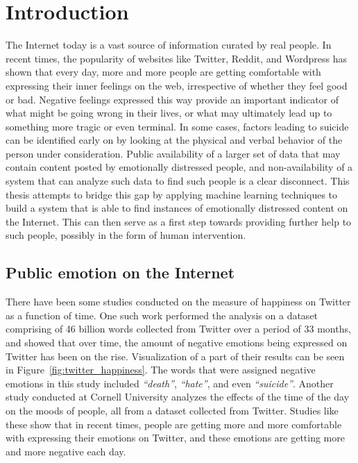 \chapter{Introduction}
\label{chapter:Introduction}

The Internet today is a vast source of information curated by real people. In recent times, the popularity of websites like Twitter, Reddit, and Wordpress has shown that every day, more and more people are getting comfortable with expressing their inner feelings on the web, irrespective of whether they feel good or bad. Negative feelings expressed this way provide an important indicator of what might be going wrong in their lives, or what may ultimately lead up to something more tragic or even terminal. In some cases, factors leading to suicide can be identified early on by looking at the physical and verbal behavior of the person under consideration. Public availability of a larger set of data that may contain content posted by emotionally distressed people, and non-availability of a system that can analyze such data to find such people is a clear disconnect. This thesis attempts to bridge this gap by applying machine learning techniques to build a system that is able to find instances of emotionally distressed content on the Internet. This can then serve as a first step towards providing further help to such people, possibly in the form of human intervention.

\section{Public emotion on the Internet}
There have been some studies conducted on the measure of happiness on Twitter as a function of time. One such work \cite{dodds2011temporal} performed the analysis on a dataset comprising of 46 billion words collected from Twitter over a period of 33 months, and showed that over time, the amount of negative emotions being expressed on Twitter has been on the rise. Visualization of a part of their results can be seen in Figure~\ref{fig:twitter_happiness}. The words that were assigned negative emotions in this study included \emph{``death''}, \emph{``hate''}, and even \emph{``suicide''}. Another study conducted at Cornell University \cite{golder2011diurnal} analyzes the effects of the time of the day on the moods of people, all from a dataset collected from Twitter. Studies like these show that in recent times, people are getting more and more comfortable with expressing their emotions on Twitter, and these emotions are getting more and more negative each day.\\

